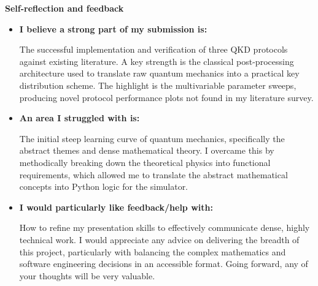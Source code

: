 \documentclass[11pt, a4paper]{report}
\begin{document}
\clearpage
\thispagestyle{empty}

\noindent\textbf{Self-reflection and feedback}

\vspace{1em}
\begin{itemize}
    \item \textbf{I believe a strong part of my submission is:}
    
The successful implementation and verification of three QKD protocols against existing literature. A key strength is the classical post-processing architecture used to translate raw quantum mechanics into a practical key distribution scheme. The highlight is the multivariable parameter sweeps, producing novel protocol performance plots not found in my literature survey.
    
    \vspace{3em}

    \item \textbf{An area I struggled with is:}
    
The initial steep learning curve of quantum mechanics, specifically the abstract themes and dense mathematical theory. I overcame this by methodically breaking down the theoretical physics into functional requirements, which allowed me to translate the abstract mathematical concepts into Python logic for the simulator.

    \vspace{3em}

    \item \textbf{I would particularly like feedback/help with:}
    
How to refine my presentation skills to effectively communicate dense, highly technical work. I would appreciate any advice on delivering the breadth of this project, particularly with balancing the complex mathematics and software engineering decisions in an accessible format. Going forward, any of your thoughts will be very valuable.

    \vspace{3em}
\end{itemize}

\clearpage
\thispagestyle{empty}
\end{document}
